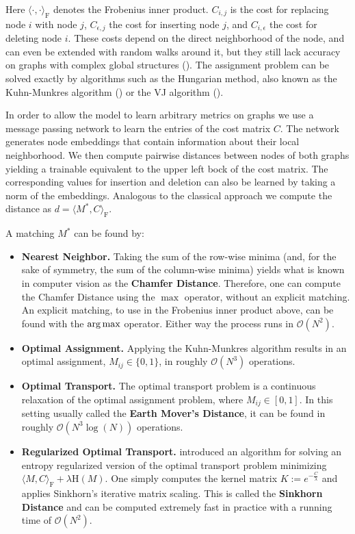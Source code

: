 \vspace{.2cm}

Here $\langle \cdot, \cdot \rangle_\mathrm{F}$ denotes the Frobenius inner product. $C_{i, j}$ is the cost for replacing node $i$ with node $j$, $C_{\epsilon, j}$ the cost for inserting node $j$, and $C_{i, \epsilon}$ the cost for deleting node $i$. These costs depend on the direct neighborhood of the node, and can even be extended with random walks around it, but they still lack accuracy on graphs with complex global structures (\citealp{hungarian2009}). The assignment problem can be solved exactly by algorithms such as the Hungarian method, also known as the Kuhn-Munkres algorithm (\citealp{hungarian1955}) or the VJ algorithm (\citealp{vj1987}).

In order to allow the model to learn arbitrary metrics on graphs we use a message passing network to learn the entries of the cost matrix $C$. The network generates node embeddings that contain information about their local neighborhood. We then compute pairwise distances between nodes of both graphs yielding a trainable equivalent to the upper left bock of the cost matrix. The corresponding values for insertion and deletion can also be learned by taking a norm of the embeddings. Analogous to the classical approach we compute the distance as $ d = \langle M^*, C \rangle_\mathrm{F} $.

A matching $M^*$ can be found by:
\begin{itemize}
     \itemsep0em
     \item \textbf{Nearest Neighbor.} Taking the sum of the row-wise minima (and, for the sake of symmetry, the sum of the column-wise minima) yields what is known in computer vision as the \textbf{Chamfer Distance}. Therefore, one can compute the Chamfer Distance using the $\max$ operator, without an explicit matching. An explicit matching, to use in the Frobenius inner product above, can be found with the $\operatorname*{arg\,max}$ operator. Either way the process runs in $\mathcal{O}(N^2)$.
     \item \textbf{Optimal Assignment.} Applying the Kuhn-Munkres algorithm results in an optimal assignment, $M_{ij} \in \{0,1\}$, in roughly $\mathcal{O}(N^3)$ operations.
     \item \textbf{Optimal Transport.} The optimal transport problem is a continuous relaxation of the optimal assignment problem, where $M_{ij} \in \left[ 0,1 \right]$. In this setting usually called the \textbf{Earth Mover's Distance}, it can be found in roughly $\mathcal{O}(N^3 \log(N))$ operations.
     \item \textbf{Regularized Optimal Transport.} \cite{sinkhorn2013} introduced an algorithm for solving an entropy regularized version of the optimal transport problem minimizing $\langle M, C \rangle_\mathrm{F} + \lambda \mathrm{H}(M)$. One simply computes the kernel matrix $ K := e^{-\frac{C}{\lambda}}$ and applies Sinkhorn’s iterative matrix scaling. This is called the \textbf{Sinkhorn Distance} and can be computed extremely fast in practice with a running time of $\mathcal{O}(N^2)$.
\end{itemize}

